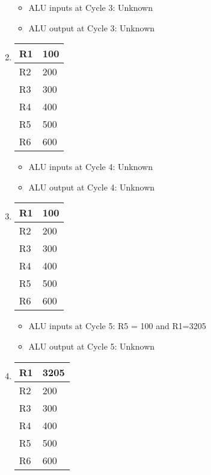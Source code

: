 \documentclass[12pt,letterpaper]{hmcpset}
\begin{document}
\begin{solution}
\begin{enumerate}[label=Cycle \arabic*]
\begin{itemize}
\item ALU inputs at Cycle 3: Unknown
\item ALU output at Cycle 3: Unknown
\end{itemize}

\item 

\begin{tabular}{|l|l|}
\hline
R1 & 100 \\
\hline 
R2 & 200 \\
\hline
R3 & 300 \\
\hline
R4 & 400 \\
\hline
R5 & 500 \\
\hline
R6 & 600 \\
\hline
\end{tabular}

\begin{itemize}
\item ALU inputs at Cycle 4: Unknown
\item ALU output at Cycle 4: Unknown
\end{itemize}

\item

\begin{tabular}{|l|l|}
\hline
R1 & 100 \\
\hline 
R2 & 200 \\
\hline
R3 & 300 \\
\hline
R4 & 400 \\
\hline
R5 & 500 \\
\hline
R6 & 600 \\
\hline
\end{tabular}

\begin{itemize}
\item ALU inputs at Cycle 5: R5 = 100 and R1=3205
\item ALU output at Cycle 5: Unknown
\end{itemize}

\item

\begin{tabular}{|l|l|}
\hline
R1 & 3205 \\
\hline 
R2 & 200 \\
\hline
R3 & 300 \\
\hline
R4 & 400 \\
\hline
R5 & 500 \\
\hline
R6 & 600 \\
\hline
\end{tabular}


\end{enumerate}
\end{solution}
\end{document}
